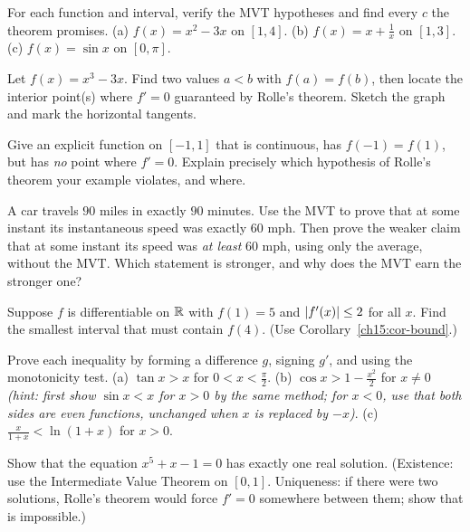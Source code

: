 \begin{exercise}[Finding $c$]
For each function and interval, verify the MVT hypotheses and find every $c$ the
theorem promises.
(a) $f(x)=x^2-3x$ on $[1,4]$.\quad
(b) $f(x)=x+\frac1x$ on $[1,3]$.\quad
(c) $f(x)=\sin x$ on $[0,\pi]$.
\end{exercise}

\begin{exercise}
Let $f(x)=x^3-3x$. Find two values $a<b$ with $f(a)=f(b)$, then locate the interior
point(s) where $f'=0$ guaranteed by Rolle's theorem. Sketch the graph and mark the
horizontal tangents.
\end{exercise}

\begin{exercise}
Give an explicit function on $[-1,1]$ that is continuous, has $f(-1)=f(1)$, but has
\emph{no} point where $f'=0$. Explain precisely which hypothesis of Rolle's theorem
your example violates, and where.
\end{exercise}

\begin{exercise}
A car travels $90$ miles in exactly $90$ minutes. Use the MVT to prove that at some
instant its instantaneous speed was exactly $60$ mph. Then prove the weaker claim
that at some instant its speed was \emph{at least} $60$ mph, using only the average,
without the MVT. Which statement is stronger, and why does the MVT earn the
stronger one?
\end{exercise}

\begin{exercise}
Suppose $f$ is differentiable on $\mathbb{R}$ with $f(1)=5$ and $\lvert f'(x)\rvert\le 2$ for all
$x$. Find the smallest interval that must contain $f(4)$. (Use
Corollary~\ref{ch15:cor-bound}.)
\end{exercise}

\begin{exercise}
Prove each inequality by forming a difference $g$, signing $g'$, and using the
monotonicity test.
(a) $\tan x > x$ for $0<x<\frac\pi2$.\quad
(b) $\cos x > 1-\frac{x^2}{2}$ for $x\ne 0$ \emph{(hint: first show $\sin x < x$ for
$x>0$ by the same method; for $x<0$, use that both sides are even functions, unchanged
when $x$ is replaced by $-x$)}.\quad
(c) $\frac{x}{1+x}<\ln(1+x)$ for $x>0$.
\end{exercise}

\begin{exercise}
Show that the equation $x^5+x-1=0$ has exactly one real solution. (Existence: use
the Intermediate Value Theorem on $[0,1]$. Uniqueness: if there were two solutions,
Rolle's theorem would force $f'=0$ somewhere between them; show that is
impossible.)
\end{exercise}

